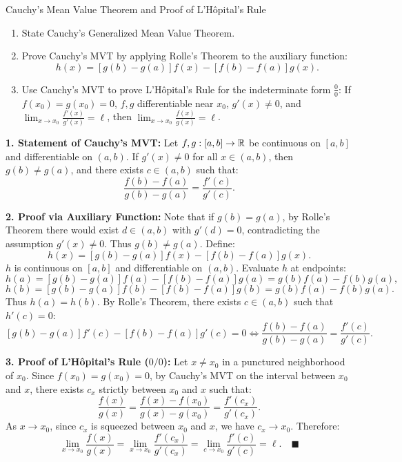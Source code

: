\begin{exercise}{Cauchy's Mean Value Theorem and Proof of L'Hôpital's Rule}
\begin{enumerate}[leftmargin=1.5em,itemsep=2pt]
  \item State Cauchy's Generalized Mean Value Theorem.
  \item Prove Cauchy's MVT by applying Rolle's Theorem to the auxiliary function:
  \[
  h(x) = [g(b) - g(a)]f(x) - [f(b) - f(a)]g(x).
  \]
  \item Use Cauchy's MVT to prove L'Hôpital's Rule for the indeterminate form $\frac{0}{0}$:
  If $f(x_0) = g(x_0) = 0$, $f, g$ differentiable near $x_0$, $g'(x) \ne 0$, and $\lim_{x \to x_0} \frac{f'(x)}{g'(x)} = \ell$, then $\lim_{x \to x_0} \frac{f(x)}{g(x)} = \ell$.
\end{enumerate}
\end{exercise}

\begin{tabletworkspace}[5.5cm]
\end{tabletworkspace}

\begin{solution}
\textbf{1. Statement of Cauchy's MVT:}
Let $f, g: [a, b] \to \mathbb{R}$ be continuous on $[a, b]$ and differentiable on $(a, b)$.
If $g'(x) \ne 0$ for all $x \in (a, b)$, then $g(b) \ne g(a)$, and there exists $c \in (a, b)$ such that:
\[
\frac{f(b) - f(a)}{g(b) - g(a)} = \frac{f'(c)}{g'(c)}.
\]

\textbf{2. Proof via Auxiliary Function:}
Note that if $g(b) = g(a)$, by Rolle's Theorem there would exist $d \in (a, b)$ with $g'(d) = 0$, contradicting the assumption $g'(x) \ne 0$. Thus $g(b) \ne g(a)$.
Define:
\[
h(x) = [g(b) - g(a)]f(x) - [f(b) - f(a)]g(x).
\]
$h$ is continuous on $[a, b]$ and differentiable on $(a, b)$.
Evaluate $h$ at endpoints:
\[
h(a) = [g(b) - g(a)]f(a) - [f(b) - f(a)]g(a) = g(b)f(a) - f(b)g(a),
\]
\[
h(b) = [g(b) - g(a)]f(b) - [f(b) - f(a)]g(b) = g(b)f(a) - f(b)g(a).
\]
Thus $h(a) = h(b)$.
By Rolle's Theorem, there exists $c \in (a, b)$ such that $h'(c) = 0$:
\[
[g(b) - g(a)]f'(c) - [f(b) - f(a)]g'(c) = 0 \iff \frac{f(b) - f(a)}{g(b) - g(a)} = \frac{f'(c)}{g'(c)}.
\]

\textbf{3. Proof of L'Hôpital's Rule ($0/0$):}
Let $x \ne x_0$ in a punctured neighborhood of $x_0$.
Since $f(x_0) = g(x_0) = 0$, by Cauchy's MVT on the interval between $x_0$ and $x$, there exists $c_x$ strictly between $x_0$ and $x$ such that:
\[
\frac{f(x)}{g(x)} = \frac{f(x) - f(x_0)}{g(x) - g(x_0)} = \frac{f'(c_x)}{g'(c_x)}.
\]
As $x \to x_0$, since $c_x$ is squeezed between $x_0$ and $x$, we have $c_x \to x_0$.
Therefore:
\[
\lim_{x \to x_0} \frac{f(x)}{g(x)} = \lim_{x \to x_0} \frac{f'(c_x)}{g'(c_x)} = \lim_{c \to x_0} \frac{f'(c)}{g'(c)} = \ell. \quad \blacksquare
\]
\end{solution}

